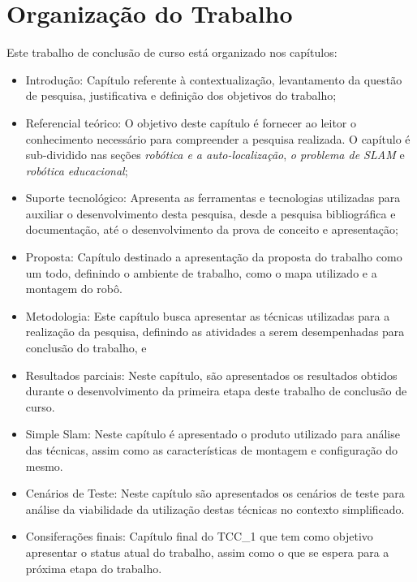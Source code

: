 	\section{Organização do Trabalho} %
	\label{sec:organização_do_trabalho}
		Este trabalho de conclusão de curso está organizado nos capítulos:
		\begin{itemize}
			\item Introdução: Capítulo referente à contextualização, levantamento da questão de pesquisa, justificativa e definição dos objetivos do trabalho;

			\item Referencial teórico: O objetivo deste capítulo é fornecer ao leitor o conhecimento necessário para compreender a pesquisa realizada. O capítulo é sub-dividido nas seções \textit{robótica e a auto-localização},  \textit{o problema de SLAM} e \textit{robótica educacional};

			\item Suporte tecnológico: Apresenta as ferramentas e tecnologias utilizadas para auxiliar o desenvolvimento desta pesquisa, desde a pesquisa bibliográfica e documentação, até o desenvolvimento da prova de conceito e apresentação;

			\item Proposta: Capítulo destinado a apresentação da proposta do trabalho como um todo, definindo o ambiente de trabalho, como o mapa utilizado e a montagem do robô.

			\item Metodologia: Este capítulo busca apresentar as técnicas utilizadas para a realização da pesquisa, definindo as atividades a serem desempenhadas para conclusão do trabalho, e

			\item Resultados parciais: Neste capítulo, são apresentados os resultados obtidos durante o desenvolvimento da primeira etapa deste trabalho de conclusão de curso.

			\item Simple Slam: Neste capítulo é apresentado o produto utilizado para análise das técnicas, assim como as características de montagem e configuração do mesmo.

			\item Cenários de Teste: Neste capítulo são apresentados os cenários de teste para análise da viabilidade da utilização destas técnicas no contexto simplificado.

			\item Consiferações finais: Capítulo final do TCC\_1 que tem como objetivo apresentar o status atual do trabalho, assim como o que se espera para a próxima etapa do trabalho.

		\end{itemize}
